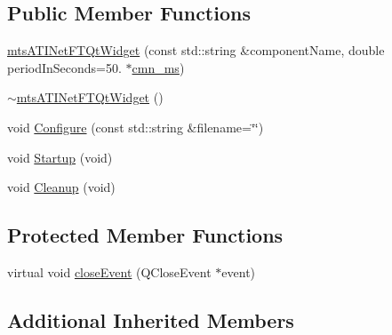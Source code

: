 \subsection*{Public Member Functions}
\begin{DoxyCompactItemize}
\item 
\hyperlink{classmts_a_t_i_net_f_t_qt_widget_a5db3fbe9d9bb69f4ff1bf6a620c00111}{mts\+A\+T\+I\+Net\+F\+T\+Qt\+Widget} (const std\+::string \&component\+Name, double period\+In\+Seconds=50. $\ast$\hyperlink{cmn_units_8h_aaf4d3f2fafb9b4a95606544b9d876b4a}{cmn\+\_\+ms})
\item 
\hyperlink{classmts_a_t_i_net_f_t_qt_widget_a2512426b8cffaddd6c6da2bf2a700009}{$\sim$mts\+A\+T\+I\+Net\+F\+T\+Qt\+Widget} ()
\item 
void \hyperlink{classmts_a_t_i_net_f_t_qt_widget_aa74bc4c4639cbd6b0501e477797b5126}{Configure} (const std\+::string \&filename=\char`\"{}\char`\"{})
\item 
void \hyperlink{classmts_a_t_i_net_f_t_qt_widget_ab0582d7c618fd885f3c32af1ec5149cd}{Startup} (void)
\item 
void \hyperlink{classmts_a_t_i_net_f_t_qt_widget_a784f1f913b70cf5211305b8b703e07ea}{Cleanup} (void)
\end{DoxyCompactItemize}
\subsection*{Protected Member Functions}
\begin{DoxyCompactItemize}
\item 
virtual void \hyperlink{classmts_a_t_i_net_f_t_qt_widget_a6bb14f11745ba121273aadcc7ab245c4}{close\+Event} (Q\+Close\+Event $\ast$event)
\end{DoxyCompactItemize}
\subsection*{Additional Inherited Members}


